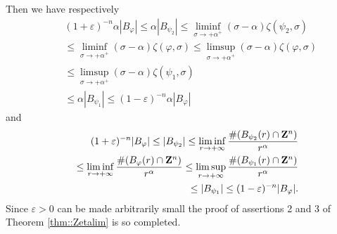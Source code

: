 \documentclass[12pt,a4paper]{amsart}
\begin{document}
Then we have respectively
\begin{eqnarray}
	&&(1+{\varepsilon})^{-{n}}{\alpha}|{B}_{\varphi}|
	\leq{\alpha}|{B}_{{\psi}_2}|
	\leq\liminf_{\sigma\to+{\alpha}^+}(\sigma-{\alpha}){\zeta}({{\psi}_2},\sigma)
	\nonumber\\
	&&\leq\liminf_{\sigma\to+{\alpha}^+}(\sigma-{\alpha}){\zeta}({\varphi},\sigma)
	\leq\limsup_{\sigma\to+{\alpha}^+}(\sigma-{\alpha}){\zeta}({\varphi},\sigma)
	\nonumber\\
	&&\leq\limsup_{\sigma\to+{\alpha}^+}(\sigma-{\alpha}){\zeta}({{\psi}_1},\sigma)
	\nonumber\\
	&&\leq{\alpha}|{B}_{{\psi}_1}|
	\leq(1-{\varepsilon})^{-{n}}{\alpha}|{B}_{\varphi}|
	\nonumber
\end{eqnarray}
and
\begin{eqnarray}
	&&(1+{\varepsilon})^{-{n}}|{B}_{\varphi}|\leq|{B}_{{\psi}_2}|
	\leq\liminf_{{r}\to+\infty}
		\frac{\#({B}_{{\psi}_2}({r})\cap{{\bf Z}}^{n})}{{r}^{\alpha}}
	\nonumber\\
	&&\leq\liminf_{{r}\to+\infty}
		\frac{\#({B}_{\varphi}({r})\cap{{\bf Z}}^{n})}{{r}^{\alpha}}
	\leq\limsup_{{r}\to+\infty}
		\frac{\#({B}_{{\psi}_1}({r})\cap{{\bf Z}}^{n})}{{r}^{\alpha}}
	\nonumber\\
	&&\leq|{B}_{{\psi}_1}|
	\leq(1-{\varepsilon})^{-{n}}|{B}_{\varphi}|.
	\nonumber
\end{eqnarray}
Since ${\varepsilon}>0$ can be made arbitrarily small the proof of
assertions 2 and 3 of Theorem \ref{thm::Zetalim} is so completed.
\end{document}
